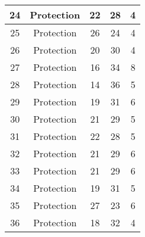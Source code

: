 \documentclass[results.tex]{subfiles}
\begin{document}
\begin{center}
\begin{tabular}{| c || c | c | c | c |}
            \hline
            24                      & Protection                   & 22                     & 28                      & 4                    \\
            \hline
            25                      & Protection                   & 26                     & 24                      & 4                    \\
            \hline
            26                      & Protection                   & 20                     & 30                      & 4                    \\
            \hline
            27                      & Protection                   & 16                     & 34                      & 8                    \\
            \hline
            28                      & Protection                   & 14                     & 36                      & 5                    \\
            \hline
            29                      & Protection                   & 19                     & 31                      & 6                    \\
            \hline
            30                      & Protection                   & 21                     & 29                      & 5                    \\
            \hline
            31                      & Protection                   & 22                     & 28                      & 5                    \\
            \hline
            32                      & Protection                   & 21                     & 29                      & 6                    \\
            \hline
            33                      & Protection                   & 21                     & 29                      & 6                    \\
            \hline
            34                      & Protection                   & 19                     & 31                      & 5                    \\
            \hline
            35                      & Protection                   & 27                     & 23                      & 6                    \\
            \hline
            36                      & Protection                   & 18                     & 32                      & 4                    \\

\end{tabular}
\end{center}
\end{document}
